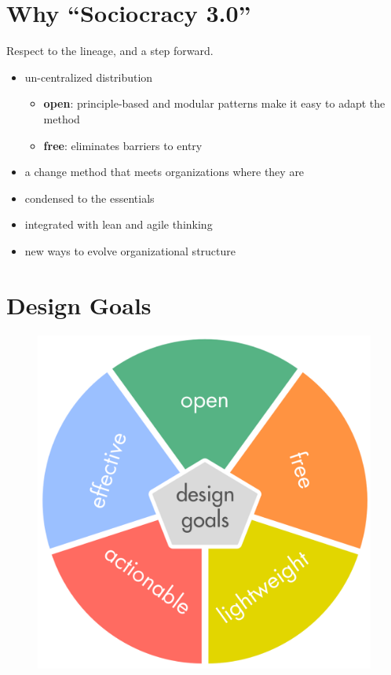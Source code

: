\section{Why ``Sociocracy 3.0''}
\label{whysociocracy3.0}

Respect to the lineage, and a step forward.

\begin{itemize}
\item un-centralized distribution

\begin{itemize}
\item \textbf{open}: principle-based and modular patterns make it easy to adapt the method

\item \textbf{free}: eliminates barriers to entry

\end{itemize}

\item a change method that meets organizations where they are

\item condensed to the essentials

\item integrated with lean and agile thinking

\item new ways to evolve organizational structure

\end{itemize}

\section{Design Goals}
\label{designgoals}

\begin{figure}[htbp]
\centering
\includegraphics[keepaspectratio,width=\textwidth,height=0.75\textheight]{img/general/design-goals.png}
\end{figure}

